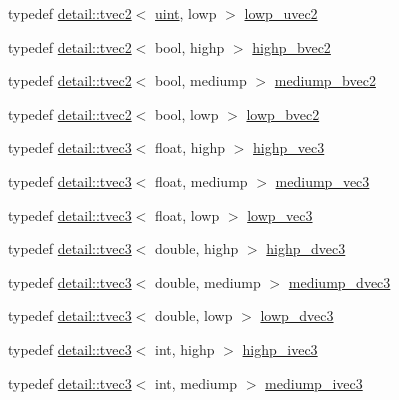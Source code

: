 \begin{DoxyCompactItemize}
typedef \hyperlink{structglm_1_1detail_1_1tvec2}{detail\+::tvec2}$<$ \hyperlink{group__core__precision_ga4fd29415871152bfb5abd588334147c8}{uint}, lowp $>$ \hyperlink{group__core__precision_ga06c64bb528bbecf276ab2d4a2b6c934e}{lowp\+\_\+uvec2}
\item 
typedef \hyperlink{structglm_1_1detail_1_1tvec2}{detail\+::tvec2}$<$ bool, highp $>$ \hyperlink{group__core__precision_ga4153415d1f3d390219ac9464652ac377}{highp\+\_\+bvec2}
\item 
typedef \hyperlink{structglm_1_1detail_1_1tvec2}{detail\+::tvec2}$<$ bool, mediump $>$ \hyperlink{group__core__precision_ga1406d96eb96694d91052d3f882658ab2}{mediump\+\_\+bvec2}
\item 
typedef \hyperlink{structglm_1_1detail_1_1tvec2}{detail\+::tvec2}$<$ bool, lowp $>$ \hyperlink{group__core__precision_ga8ff6222d4bb4245106dab0727c8e8a45}{lowp\+\_\+bvec2}
\item 
typedef \hyperlink{structglm_1_1detail_1_1tvec3}{detail\+::tvec3}$<$ float, highp $>$ \hyperlink{group__core__precision_ga4879124da7a18d6b681d933cb8c4267d}{highp\+\_\+vec3}
\item 
typedef \hyperlink{structglm_1_1detail_1_1tvec3}{detail\+::tvec3}$<$ float, mediump $>$ \hyperlink{group__core__precision_ga10acc767a046b85205f52ce7f834626f}{mediump\+\_\+vec3}
\item 
typedef \hyperlink{structglm_1_1detail_1_1tvec3}{detail\+::tvec3}$<$ float, lowp $>$ \hyperlink{group__core__precision_ga062795097526e2758d34cb38387dd82d}{lowp\+\_\+vec3}
\item 
typedef \hyperlink{structglm_1_1detail_1_1tvec3}{detail\+::tvec3}$<$ double, highp $>$ \hyperlink{group__core__precision_ga4962711854156dae8ebb4eb39237c542}{highp\+\_\+dvec3}
\item 
typedef \hyperlink{structglm_1_1detail_1_1tvec3}{detail\+::tvec3}$<$ double, mediump $>$ \hyperlink{group__core__precision_gac051f0702cb0e717db5dd913f6261388}{mediump\+\_\+dvec3}
\item 
typedef \hyperlink{structglm_1_1detail_1_1tvec3}{detail\+::tvec3}$<$ double, lowp $>$ \hyperlink{group__core__precision_ga9bdb864f7242863e1227e3209f5b2dc4}{lowp\+\_\+dvec3}
\item 
typedef \hyperlink{structglm_1_1detail_1_1tvec3}{detail\+::tvec3}$<$ int, highp $>$ \hyperlink{group__core__precision_gae9f0a321de8ee92dce9d4400362d71e7}{highp\+\_\+ivec3}
\item 
typedef \hyperlink{structglm_1_1detail_1_1tvec3}{detail\+::tvec3}$<$ int, mediump $>$ \hyperlink{group__core__precision_ga520d24fa0ea887284b80a02c062ca7b8}{mediump\+\_\+ivec3}

\end{DoxyCompactItemize}
